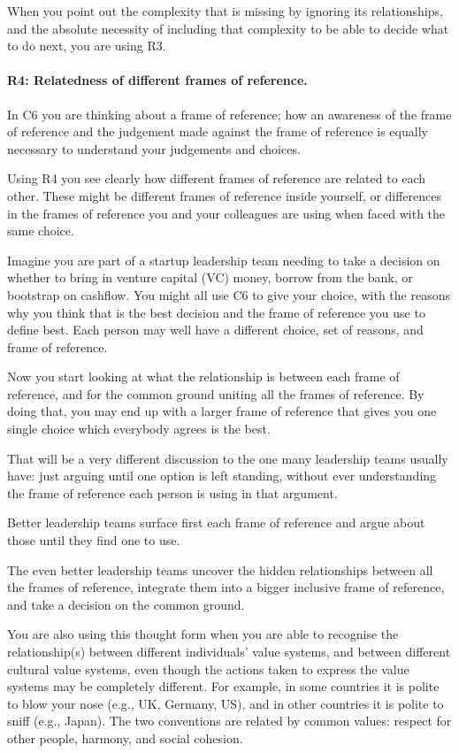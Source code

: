 When you point out the complexity that is missing by ignoring its relationships, and the absolute necessity of including that complexity to be able to decide what to do next, you are using R3.
\paragraph{\textbf{R4: Relatedness of different frames of reference.}}
In C6 you are thinking about a frame of reference; how an awareness of the frame of reference and the judgement made against the frame of reference is equally necessary to understand your judgements and choices.


Using R4 you see clearly how different frames of reference are related to each other. These might be different frames of reference inside yourself, or differences in the frames of reference you and your colleagues are using when faced with the same choice.


Imagine you are part of a startup leadership team needing to take a decision on whether to bring in venture capital (VC) money, borrow from the bank, or bootstrap on cashflow. You might all use C6 to give your choice, with the reasons why you think that is the best decision and the frame of reference you use to define best. Each person may well have a different choice, set of reasons, and frame of reference.


Now you start looking at what the relationship is between each frame of reference, and for the common ground uniting all the frames of reference.  By doing that, you may end up with a larger frame of reference that gives you one single choice which everybody agrees is the best.


That will be a very different discussion to the one many leadership teams usually have: just arguing until one option is left standing, without ever understanding the frame of reference each person is using in that argument. 


Better leadership teams surface first each frame of reference and argue about those until they find one to use.


The even better leadership teams uncover the hidden relationships between all the frames of reference, integrate them into a bigger inclusive frame of reference, and take a decision on the common ground.


You are also using this thought form when you are able to recognise the relationship(s) between different individuals' value systems, and between different cultural value systems, even though the actions taken to express the value systems may be completely different. For example, in some countries it is polite to blow your nose (e.g., UK, Germany, US), and in other countries it is polite to sniff (e.g., Japan). The two conventions are related by common values: respect for other people, harmony, and social cohesion.
